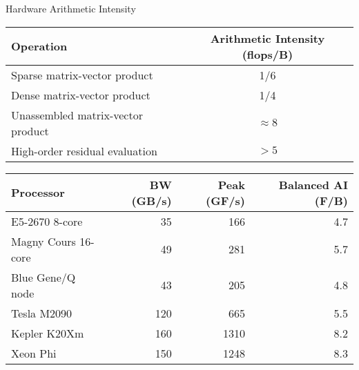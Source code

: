 \begin{frame}{Hardware Arithmetic Intensity}
  \begin{tabular}{lc}
    \toprule
    Operation                         & Arithmetic Intensity (flops/B) \\
    \midrule
    Sparse matrix-vector product      & 1/6                  \\
    Dense matrix-vector product       & 1/4                  \\
    Unassembled matrix-vector product & $\approx 8$          \\
    High-order residual evaluation    & $> 5$                \\
    \bottomrule
  \end{tabular}

  \bigskip

  \begin{tabular}{lrrr}
    \toprule
    Processor & BW (GB/s) & Peak (GF/s) & Balanced AI (F/B) \\
    \midrule
    E5-2670 8-core      & 35   & 166  & 4.7 \\
    Magny Cours 16-core & 49   & 281  & 5.7 \\
    Blue Gene/Q node    & 43   & 205  & 4.8 \\
    Tesla M2090         & 120  & 665  & 5.5 \\
    Kepler K20Xm        & 160 & 1310 & 8.2 \\ %
    Xeon Phi            & 150 & 1248 & 8.3 \\
    \bottomrule
  \end{tabular}
\end{frame}
